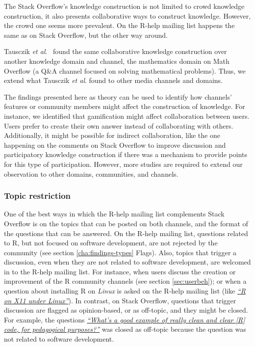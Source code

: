 \documentclass{sig-alternate-05-2015}
\begin{document}
	The Stack Overflow's knowledge construction is not limited to crowd knowledge construction, it also presents collaborative ways to construct knowledge.
	However, the crowd one seems more prevalent.
	On the R-help mailing list happens the same as on Stack Overflow, but the other way around.


	Tausczik \textit{et al}.~\cite{Tausczik2014} found the same collaborative knowledge construction over another knowledge domain and channel, the mathematics domain on Math Overflow (a Q\&A channel focused on solving mathematical problems).
	Thus, we extend what Tausczik \textit{et al}. found to other media channels and domains.

	The findings presented here as theory can be used to identify how channels' features or community members might affect the construction of knowledge.
	For instance, we identified that gamification might affect collaboration between users. 
	Users prefer to create their own answer instead of collaborating with others.
	Additionally, it might be possible for indirect collaboration, like the one happening on the comments on Stack Overflow to improve discussion and participatory knowledge construction if there was a mechanism to provide points for this type of participation.
	However, more studies are required to extend our observation to other domains, communities, and channels.


	\subsubsection{Topic restriction}

	One of the best ways in which the R-help mailing list complements Stack Overflow is on the topics that can be posted on both channels, and the format of the questions that can be answered. 
	On the R-help mailing list, questions related to R, but not focused on software development, are not rejected by the community (see section \ref{cha:findings-types} Flags).
	Also, topics that trigger a discussion, even when they are not related to software development, are welcomed in to the R-help mailing list.
	For instance, when users discuss the creation or improvement of the R community channels (see section \ref{sec:userbeh}); or when a question about installing R on \textit{Linux} is asked on the R-help mailing list (like {\href{http://goo.gl/1JLOUF}{\textit{``R on X11 under Linux''}}}).
	In contrast, on Stack Overflow, questions that trigger discussion are flagged as opinion-based, or as off-topic, and they might be closed. 
	For example, the questions \textit{\href{http://goo.gl/9JjZW1}{``What's a good example of really clean and clear [R] code, for pedagogical purposes?''}} was closed as off-topic because the question was not related to software development.
\end{document}
